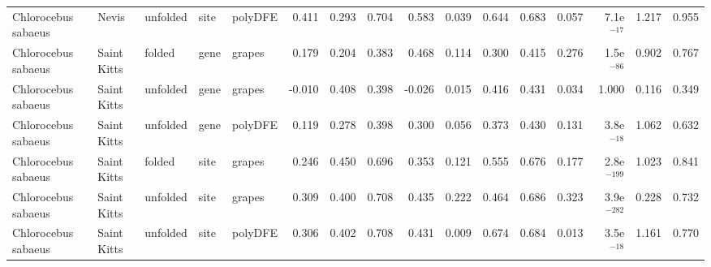 \begin{longtable}{lllllrrrrrrrrrrr}
 Chlorocebus sabaeus &                     Nevis &  unfolded &  site &  polyDFE &                              0.411 &                               0.293 &                 0.704 &                 0.583 &                              0.039 &                               0.644 &                 0.683 &                 0.057 &  7.1e$^{-17}$ &  1.217 &  0.955 \\
 Chlorocebus sabaeus &               Saint Kitts &    folded &  gene &   grapes &                              0.179 &                               0.204 &                 0.383 &                 0.468 &                              0.114 &                               0.300 &                 0.415 &                 0.276 &  1.5e$^{-86}$ &  0.902 &  0.767 \\
 Chlorocebus sabaeus &               Saint Kitts &  unfolded &  gene &   grapes &                             -0.010 &                               0.408 &                 0.398 &                -0.026 &                              0.015 &                               0.416 &                 0.431 &                 0.034 &         1.000 &  0.116 &  0.349 \\
 Chlorocebus sabaeus &               Saint Kitts &  unfolded &  gene &  polyDFE &                              0.119 &                               0.278 &                 0.398 &                 0.300 &                              0.056 &                               0.373 &                 0.430 &                 0.131 &  3.8e$^{-18}$ &  1.062 &  0.632 \\
 Chlorocebus sabaeus &               Saint Kitts &    folded &  site &   grapes &                              0.246 &                               0.450 &                 0.696 &                 0.353 &                              0.121 &                               0.555 &                 0.676 &                 0.177 & 2.8e$^{-199}$ &  1.023 &  0.841 \\
 Chlorocebus sabaeus &               Saint Kitts &  unfolded &  site &   grapes &                              0.309 &                               0.400 &                 0.708 &                 0.435 &                              0.222 &                               0.464 &                 0.686 &                 0.323 & 3.9e$^{-282}$ &  0.228 &  0.732 \\
 Chlorocebus sabaeus &               Saint Kitts &  unfolded &  site &  polyDFE &                              0.306 &                               0.402 &                 0.708 &                 0.431 &                              0.009 &                               0.674 &                 0.684 &                 0.013 &  3.5e$^{-18}$ &  1.161 &  0.770 \\

\end{longtable}
